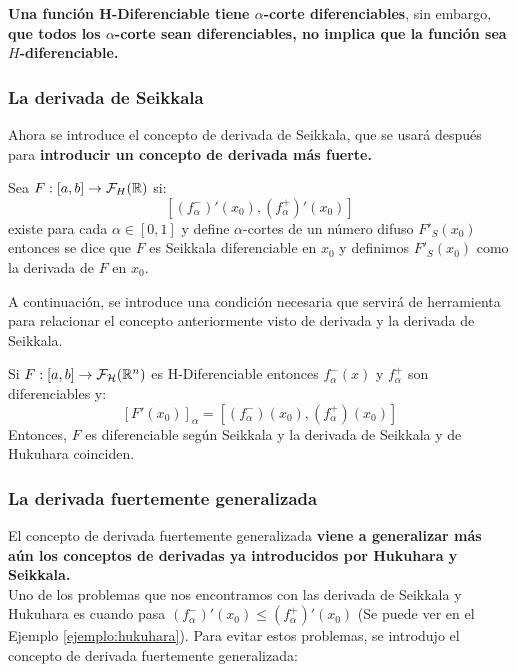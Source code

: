 \textbf{Una función H-Diferenciable tiene $\alpha$-corte diferenciables}, sin embargo, \textbf{que todos los $\alpha$-corte sean diferenciables, no implica que la función sea $H$-diferenciable.}

\subsubsection{La derivada de Seikkala}
Ahora se introduce el concepto de derivada de Seikkala, que se usará después para \textbf{introducir un concepto de derivada más fuerte.}

\begin{definicion}
  Sea $F: [a, b] \rightarrow \mathcal{F}_H(\mathbb R)$ si:
  \[
    [(f^-_\alpha)'(x_0), (f^+_\alpha)'(x_0)]
    \]
    existe para cada $\alpha \in [0, 1]$ y define $\alpha$-cortes de un número difuso $F'_S(x_0)$ entonces se dice que $F$ es Seikkala diferenciable en $x_0$ y definimos $F'_S(x_0)$ como la derivada de $F$ en $x_0$.
\end{definicion}

A continuación, se introduce una condición necesaria que servirá de herramienta para relacionar el concepto anteriormente visto de derivada y la derivada de Seikkala.

\begin{teorema}
  Si $F: [a, b] \rightarrow \mathcal{F}_\mathcal{H}(\mathbb R^n)$ es H-Diferenciable entonces $f_\alpha^-(x)$ y $f_\alpha^+$ son diferenciables y:
  \[
    [F'(x_0)]_\alpha = [(f_\alpha^-)(x_0), (f_\alpha^+)(x_0)]
    \]
    Entonces, $F$ es diferenciable según Seikkala y la derivada de Seikkala y de Hukuhara coinciden.
\end{teorema}

\subsubsection{La derivada fuertemente generalizada}
El concepto de derivada fuertemente generalizada \textbf{viene a generalizar más aún los conceptos de derivadas ya introducidos por Hukuhara y Seikkala.} \\

Uno de los problemas que nos encontramos con las derivada de Seikkala y Hukuhara es cuando pasa $(f^-_\alpha)'(x_0) \leq (f^+_\alpha)'(x_0)$ (Se puede ver en el Ejemplo \ref{ejemplo:hukuhara}). Para evitar estos problemas, se introdujo el concepto de derivada fuertemente generalizada:


